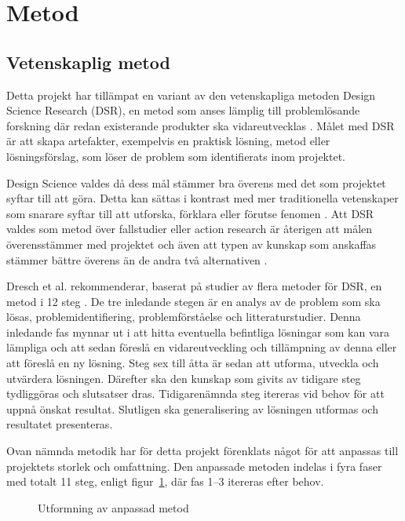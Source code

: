 \section{Metod} %
\label{sec:metod}
    
    \subsection{Vetenskaplig metod} %
    \label{sub:vetenskaplig_metod}
    	Detta projekt har tillämpat en variant av den vetenskapliga metoden Design Science Research (DSR), en metod som anses lämplig till problemlösande forskning där redan existerande produkter ska vidareutvecklas \cite[s.~13]{dsr}. Målet med DSR är att skapa artefakter, exempelvis en praktisk lösning, metod eller lösningsförslag, som löser de problem som identifierats inom projektet. \bigskip

        Design Science valdes då dess mål stämmer bra överens med det som projektet syftar till att göra. Detta kan sättas i kontrast med mer traditionella vetenskaper som snarare syftar till att utforska, förklara eller förutse fenomen \cite[s.~13]{dsr}. Att DSR valdes som metod över fallstudier eller action research är återigen att målen överensstämmer med projektet och även att typen av kunskap som anskaffas stämmer bättre överens än de andra två alternativen \cite[s.~95]{dsr}.\bigskip

    	Dresch et al. rekommenderar, baserat på studier av flera metoder för DSR, en metod i 12 steg \cite[s.~118--126]{dsr}. De tre inledande stegen är en analys av de problem som ska lösas, problemidentifiering, problemförståelse och litteraturstudier. Denna inledande fas mynnar ut i att hitta eventuella befintliga lösningar som kan vara lämpliga och att sedan föreslå en vidareutveckling och tillämpning av denna eller att föreslå en ny lösning. Steg sex till åtta är sedan att utforma, utveckla och utvärdera lösningen. Därefter ska den kunskap som givits av tidigare steg tydliggöras och slutsatser dras. Tidigarenämnda steg itereras vid behov för att uppnå önskat resultat. Slutligen ska generalisering av lösningen utformas och resultatet presenteras. \bigskip

    	Ovan nämnda metodik har för detta projekt förenklats något för att anpassas till projektets storlek och omfattning. Den anpassade metoden indelas i fyra faser med totalt 11 steg, enligt figur~\ref{fig:method}, där fas 1--3 itereras efter behov.

        \begin{figure}[b]
            \centering
            
            \caption{\label{fig:method} Utformning av anpassad metod}
        \end{figure}

